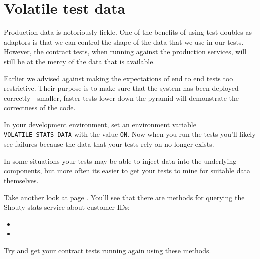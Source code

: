 \chapter*{Volatile test data}

Production data is notoriously fickle. One of the benefits of using test doubles as adaptors is that we can control the shape of the data that we use in our tests. However, the contract tests, when running against the production services, will still be at the mercy of the data that is available.

Earlier we advised against making the expectations of end to end tests too restrictive. Their purpose is to make sure that the system has been deployed correctly - smaller, faster tests lower down the pyramid will demonstrate the correctness of the code.

In your development environment, set an environment variable \texttt{VOLATILE_STATS_DATA} with the value \texttt{ON}. Now when you run the tests you'll likely see failures because the data that your tests rely on no longer exists.


In some situations your tests may be able to inject data into the underlying components, but more often its easier to get your tests to mine for suitable data themselves.

Take another look at page \pageref{service-spec}. You'll see that there are methods for querying the Shouty stats service about customer IDs:

\begin{itemize}
    \item \texttt{\GetCustomerIDsMethod}
    \item \texttt{\IsValidCustomerMethod}
\end{itemize}

Try and get your contract tests running again using these methods.

